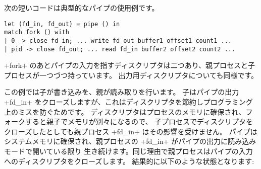 \begin{example} %
次の短いコードは典型的なパイプの使用例です。
%
\begin{lstlisting}
let (fd_in, fd_out) = pipe () in
match fork () with
| 0 -> close fd_in; ... write fd_out buffer1 offset1 count1 ...
| pid -> close fd_out; ... read fd_in buffer2 offset2 count2 ...
\end{lstlisting}
%
\ml+fork+ のあとパイプの入力を指すディスクリプタは二つあり、親プロセスと子プロセスが一つづつ持っています。
出力用ディスクリプタについても同様です。
%
\begin{myimage}[width="45\%"]
\end{myimage}
%
この例では子が書き込みを、親が読み取りを行います。
子はパイプの出力 \ml+fd_in+ をクローズしますが、これはディスクリプタを節約しプログラミング上のミスを防ぐためです。
ディスクリプタはプロセスのメモリに確保され、フォークすると親子でメモリが別々になるので、
子プロセスでディスクリプタをクローズしたとしても親プロセス \ml+fd_in+ はその影響を受けません。
パイプはシステムメモリに確保され、親プロセスの \ml+fd_in+ がパイプの出力に読み込みモードで開いている限り
生き続けます。同じ理由で親プロセスはパイプの入力へのディスクリプタをクローズします。
結果的に以下のような状態となります:



\end{example}
